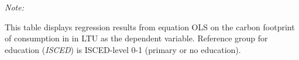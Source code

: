 \begin{table}[htbp!]
\begin{adjustbox}{width = 1\textwidth, max height = 0.95\textheight, center}
\begin{threeparttable}[b]
         \begin{tablenotes}\item \medskip \textit{Note:}
            \item This table displays regression results from equation OLS on the carbon footprint of consumption in  in LTU as the dependent variable.  Reference group for education (\textit{ISCED}) is ISCED-level 0-1 (primary or no education).
         \end{tablenotes}
      \end{threeparttable}
   \end{adjustbox}
\end{table}



